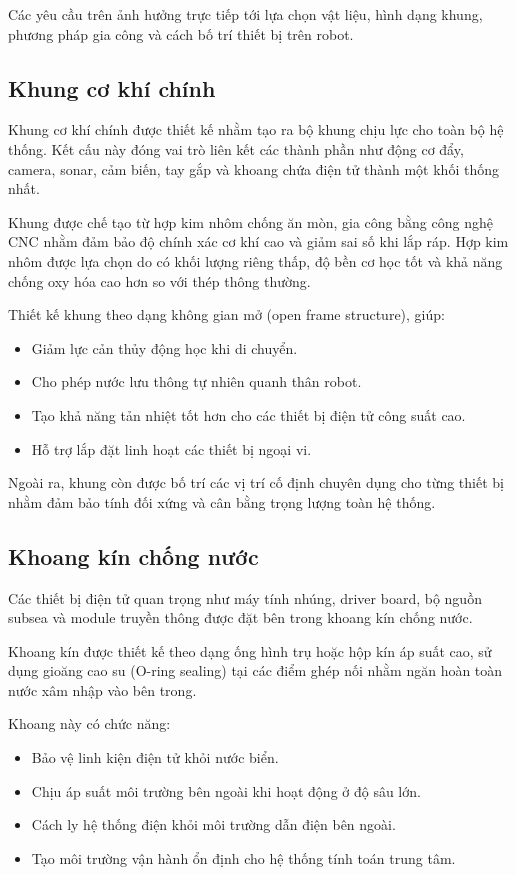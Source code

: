 \documentclass[../DoAn.tex]{subfiles}
\begin{document}
Các yêu cầu trên ảnh hưởng trực tiếp tới lựa chọn vật liệu, hình dạng khung, phương pháp gia công và cách bố trí thiết bị trên robot.

\subsection{Khung cơ khí chính}

Khung cơ khí chính được thiết kế nhằm tạo ra bộ khung chịu lực cho toàn bộ hệ thống. Kết cấu này đóng vai trò liên kết các thành phần như động cơ đẩy, camera, sonar, cảm biến, tay gắp và khoang chứa điện tử thành một khối thống nhất.

Khung được chế tạo từ hợp kim nhôm chống ăn mòn, gia công bằng công nghệ CNC nhằm đảm bảo độ chính xác cơ khí cao và giảm sai số khi lắp ráp. Hợp kim nhôm được lựa chọn do có khối lượng riêng thấp, độ bền cơ học tốt và khả năng chống oxy hóa cao hơn so với thép thông thường.

Thiết kế khung theo dạng không gian mở (open frame structure), giúp:

\begin{itemize}
    \item Giảm lực cản thủy động học khi di chuyển.
    \item Cho phép nước lưu thông tự nhiên quanh thân robot.
    \item Tạo khả năng tản nhiệt tốt hơn cho các thiết bị điện tử công suất cao.
    \item Hỗ trợ lắp đặt linh hoạt các thiết bị ngoại vi.
\end{itemize}

Ngoài ra, khung còn được bố trí các vị trí cố định chuyên dụng cho từng thiết bị nhằm đảm bảo tính đối xứng và cân bằng trọng lượng toàn hệ thống.

\subsection{Khoang kín chống nước}

Các thiết bị điện tử quan trọng như máy tính nhúng, driver board, bộ nguồn subsea và module truyền thông được đặt bên trong khoang kín chống nước.

Khoang kín được thiết kế theo dạng ống hình trụ hoặc hộp kín áp suất cao, sử dụng gioăng cao su (O-ring sealing) tại các điểm ghép nối nhằm ngăn hoàn toàn nước xâm nhập vào bên trong.

Khoang này có chức năng:

\begin{itemize}
    \item Bảo vệ linh kiện điện tử khỏi nước biển.
    \item Chịu áp suất môi trường bên ngoài khi hoạt động ở độ sâu lớn.
    \item Cách ly hệ thống điện khỏi môi trường dẫn điện bên ngoài.
    \item Tạo môi trường vận hành ổn định cho hệ thống tính toán trung tâm.
\end{itemize}
\end{document}
